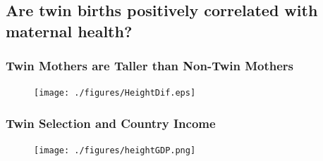 \documentclass[9pt,letterpaper,subeqn]{beamer}
\begin{document}
\subsection{Are twin births positively correlated with maternal health?}

\begin{frame}[label=HealthTwin]
\frametitle{Twin Mothers are Taller than Non-Twin Mothers}

\begin{figure}[htpb!]
\centering
  \texttt{[image: ./figures/HeightDif.eps]}
\end{figure}
\hyperlink{EducTwin}{}
\end{frame}


\frame{
\vspace{5mm}

}


\frame{
\vspace{5mm}

}


\begin{frame}[label=USA2]

\end{frame}



\begin{frame}[label=USA1]

\end{frame}


\begin{frame}[label=Scotland]

\end{frame}



\begin{frame}[label=Chile]

\end{frame}


\begin{frame}[label=Spain2]

\end{frame}

\begin{frame}[label=UK]
 
\end{frame}

\begin{frame}[label=HealthGDP]
\frametitle{Twin Selection and Country Income}
\begin{figure}[htpb!]
\centering
  \texttt{[image: ./figures/heightGDP.png]}
\end{figure}
\hyperlink{EducGDP}{}
\end{frame}
\end{document}
